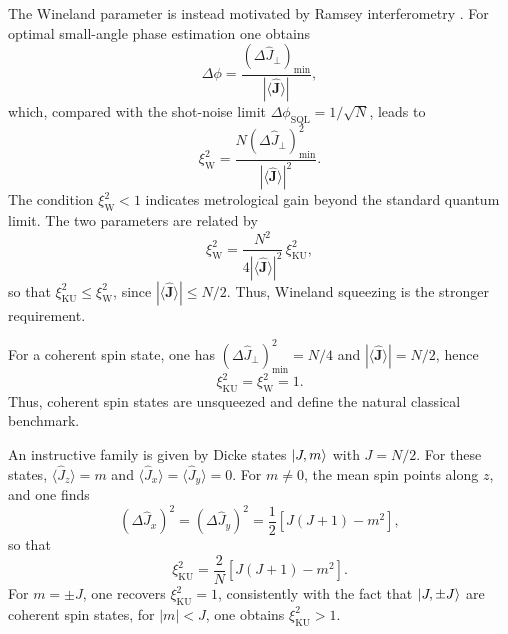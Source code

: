 The Wineland parameter is instead motivated by Ramsey interferometry \cite{Wineland94,Ma11}. For optimal small-angle phase estimation one obtains
\begin{equation}
	\Delta \phi
	=
	\frac{(\Delta \hat J_\perp)_{\min}}{|\langle \hat{\mathbf{J}}\rangle|},
	\label{eq:intro_qm_phase_uncertainty_collective_spin_ss}
\end{equation}
which, compared with the shot-noise limit \( \Delta\phi_{\mathrm{SQL}}=1/\sqrt{N} \), leads to
\begin{equation}
	\xi_{\mathrm{W}}^{2}
	=
	\frac{N(\Delta \hat J_\perp)^2_{\min}}{|\langle \hat{\mathbf{J}}\rangle|^2}.
	\label{eq:intro_qm_wineland_parameter_definition_ss}
\end{equation}
The condition \( \xi_{\mathrm{W}}^2<1 \) indicates metrological gain beyond the standard quantum limit. The two parameters are related by
\begin{equation}
	\xi_{\mathrm{W}}^{2}
	=
	\frac{N^2}{4|\langle \hat{\mathbf{J}}\rangle|^2}\,
	\xi_{\mathrm{KU}}^{2},
	\label{eq:intro_qm_ku_wineland_relation_ss}
\end{equation}
so that \( \xi_{\mathrm{KU}}^{2}\leq \xi_{\mathrm{W}}^{2} \), since \( |\langle \hat{\mathbf{J}}\rangle|\leq N/2 \). Thus, Wineland squeezing is the stronger requirement.

For a coherent spin state, one has \( (\Delta \hat J_\perp)^2_{\min}=N/4 \) and \( |\langle \hat{\mathbf{J}}\rangle|=N/2 \), hence
\begin{equation}
	\xi_{\mathrm{KU}}^{2}=\xi_{\mathrm{W}}^{2}=1.
	\label{eq:intro_qm_css_spin_squeezing_parameters}
\end{equation}
Thus, coherent spin states are unsqueezed and define the natural classical benchmark.

An instructive family is given by Dicke states \(\ket{J,m}\) with \(J=N/2\). For these states, \(\langle \hat J_z\rangle=m\) and \(\langle \hat J_x\rangle=\langle \hat J_y\rangle=0\). For \(m\neq 0\), the mean spin points along \(z\), and one finds
\begin{equation}
	(\Delta \hat J_x)^2=(\Delta \hat J_y)^2
	=
	\frac{1}{2}\left[J(J+1)-m^2\right],
	\label{eq:intro_qm_dicke_transverse_variances}
\end{equation}
so that
\begin{equation}
	\xi_{\mathrm{KU}}^{2}
	=
	\frac{2}{N}\left[J(J+1)-m^2\right].
	\label{eq:intro_qm_dicke_ku_parameter}
\end{equation}
For \(m=\pm J\), one recovers \(\xi_{\mathrm{KU}}^{2}=1\), consistently with the fact that \(\ket{J,\pm J}\) are coherent spin states, for \(|m|<J\), one obtains \(\xi_{\mathrm{KU}}^{2}>1\). 

